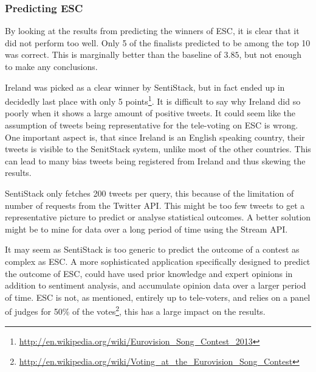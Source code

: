 \subsubsection{Predicting ESC}

By looking at the results from predicting the winners of ESC, it is clear that it did not perform too well. Only 5 of the finalists predicted to be among the top 10 was correct. This is marginally better than the baseline of $3.85$, but not enough to make any conclusions. 

Ireland was picked as a clear winner by SentiStack, but in fact ended up in decidedly last place with only 5 points\footnote{\url{http://en.wikipedia.org/wiki/Eurovision_Song_Contest_2013}}. It is difficult to say why Ireland did so poorly when it shows a large amount of positive tweets. It could seem like the assumption of tweets being representative for the tele-voting on ESC is wrong. One important aspect is, that since Ireland is an English speaking country, their tweets is visible to the SenitStack system, unlike most of the other countries. This can lead to many bias tweets being registered from Ireland and thus skewing the results. 

SentiStack only fetches 200 tweets per query, this because of the limitation of number of requests from the Twitter API. This might be too few tweets to get a representative picture to predict or analyse statistical outcomes. A better solution might be to mine for data over a long period of time using the Stream API. 

It may seem as SentiStack is too generic to predict the outcome of a contest as complex as ESC. A more sophisticated application specifically designed to predict the outcome of ESC, could have used prior knowledge and expert opinions in addition to sentiment analysis, and accumulate opinion data over a larger period of time. ESC is not, as mentioned, entirely up to tele-voters, and relies on a panel of judges for 50\% of the votes\footnote{\url{http://en.wikipedia.org/wiki/Voting_at_the_Eurovision_Song_Contest}}, this has a large impact on the results.

